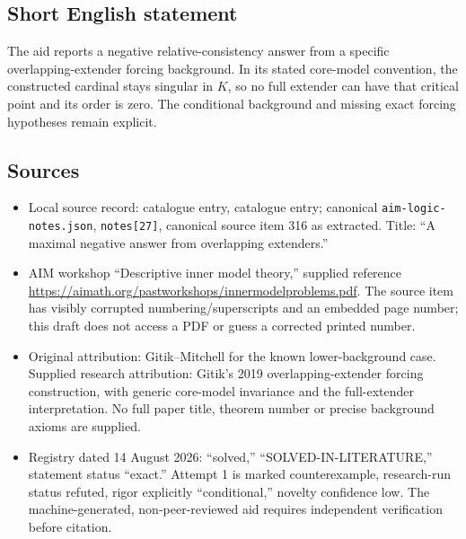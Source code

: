 \documentclass[11pt]{article}
\begin{document}
\subsection{Short English statement}
The aid reports a negative relative-consistency answer from a specific overlapping-extender forcing background. In its stated core-model convention, the constructed cardinal stays singular in \(K\), so no full extender can have that critical point and its order is zero. The conditional background and missing exact forcing hypotheses remain explicit.
\subsection{Sources}
\begin{itemize}
\item Local source record: catalogue entry, catalogue entry; canonical \texttt{aim-logic-notes.json}, \texttt{notes[27]}, canonical source item 316 as extracted. Title: ``A maximal negative answer from overlapping extenders.''
\item AIM workshop ``Descriptive inner model theory,'' supplied reference \url{https://aimath.org/pastworkshops/innermodelproblems.pdf}. The source item has visibly corrupted numbering/superscripts and an embedded page number; this draft does not access a PDF or guess a corrected printed number.
\item Original attribution: Gitik--Mitchell for the known lower-background case. Supplied research attribution: Gitik's 2019 overlapping-extender forcing construction, with generic core-model invariance and the full-extender interpretation. No full paper title, theorem number or precise background axioms are supplied.
\item Registry dated 14 August 2026: ``solved,'' ``SOLVED-IN-LITERATURE,'' statement status ``exact.'' Attempt 1 is marked counterexample, research-run status refuted, rigor explicitly ``conditional,'' novelty confidence low. The machine-generated, non-peer-reviewed aid requires independent verification before citation.
\end{itemize}
\end{document}
